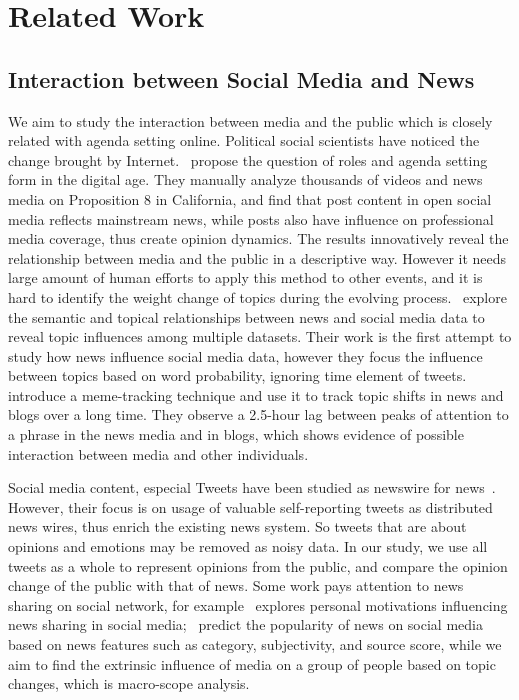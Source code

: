 \section{Related Work}
\label{sec:related_work}

\subsection{Interaction between Social Media and News}
\label{subsec:interaction}
We aim to study the interaction between media and the public which is closely related with agenda setting online. Political social scientists have noticed the change brought by Internet.~ propose the question of roles and agenda setting form in the digital age. They manually analyze thousands of videos and news media on Proposition 8 in California, and find that post content in open social media reflects mainstream news, while posts also have influence on professional media coverage, thus create opinion dynamics. The results innovatively reveal the relationship between media and the public in a descriptive way. However it needs large amount of human efforts to apply this method to other events, and it is hard to identify the weight change of topics during the evolving process.~ explore the semantic and topical relationships between news and social media data to reveal topic influences among multiple datasets. Their work is the first attempt to study how news influence social media data, however they focus the influence between topics based on word probability, ignoring time element of tweets.~ introduce a meme-tracking technique and use it to track topic shifts in news and blogs over a long time. They observe a 2.5-hour lag between peaks of attention to a phrase in the news media and in blogs, which shows evidence of possible interaction between media and other individuals.

Social media content, especial Tweets have been studied as newswire for news~\cite{macdonald2013can,sankaranarayanan2009twitterstand}. However, their focus is on usage of valuable self-reporting tweets as distributed news wires, thus enrich the existing news system. So tweets that are about opinions and emotions may be removed as noisy data. In our study, we use all tweets as a whole to represent opinions from the public, and compare the opinion change of the public with that of news.
Some work pays attention to news sharing on social network, for example~ explores personal motivations influencing news sharing in social media;~ predict the popularity of news on social media based on news features such as category, subjectivity, and source score, while we aim to find the extrinsic influence of media on a group of people based on topic changes, which is macro-scope analysis.

